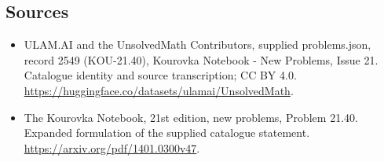 \documentclass[11pt,a4paper]{article}
\begin{document}
\subsection{Sources}
\begin{itemize}
\item[S1] ULAM.AI and the UnsolvedMath Contributors, supplied problems.json, record 2549 (KOU-21.40), Kourovka Notebook - New Problems, Issue 21. Catalogue identity and source transcription; CC BY 4.0.
\url{https://huggingface.co/datasets/ulamai/UnsolvedMath}.
\item[S2] The Kourovka Notebook, 21st edition, new problems, Problem 21.40. Expanded formulation of the supplied catalogue statement.
\url{https://arxiv.org/pdf/1401.0300v47}.
\end{itemize}
\end{document}
